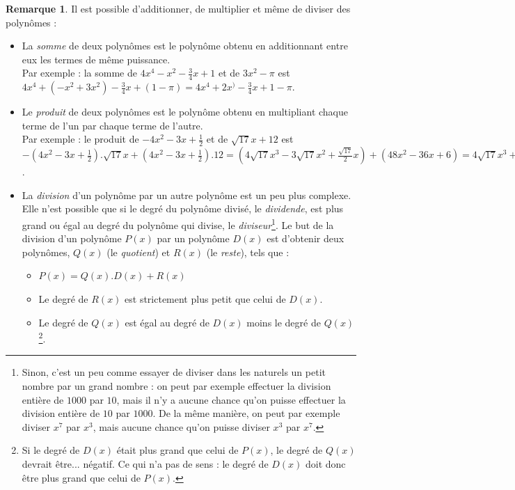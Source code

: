 \documentclass[a4paper,13pt]{scrreprt}
\theoremstyle{plain}
\theoremstyle{definition}
\newtheorem{rema}[subsection]{Remarque}
\begin{document}
\begin{rema}
	Il est possible d'additionner, de multiplier et même de diviser des polynômes :
	\begin{itemize}
		\item [$\bullet$] La \emph{somme} de deux polynômes est le polynôme obtenu en additionnant entre eux les termes de même puissance. \\
		Par exemple : la somme de $4x^4 - x^2 - \frac{3}{4}x +1$ et de $3x^2 - \pi$ est $4x^4 + (-x^2 + 3x^2) - \frac{3}{4}x + (1 - \pi) = 4x^4 + 2x^) - \frac{3}{4}x + 1 - \pi$. \\
		
		\item [$\bullet$] Le \emph{produit} de deux polynômes est le polynôme obtenu en multipliant chaque terme de l'un par chaque terme de l'autre. \\
		Par exemple : le produit de $ - 4x^2 - 3x +\frac{1}{2}$ et de $\sqrt{17}x + 12$ est $- (4x^2 - 3x +\frac{1}{2}).\sqrt{17}x + (4x^2 - 3x +\frac{1}{2}). 12 = (4\sqrt{17}x^3 - 3\sqrt{17}x^2 +\frac{\sqrt{17}}{2}x) + (48x^2 - 36x + 6) = 4\sqrt{17}x^3 + (- 3\sqrt{17}x^2 + 48x^2) + (\frac{\sqrt{17}}{2}x+36x)+6 = 4\sqrt{17}x^3 + (- 3\sqrt{17} + 48)x^2 + (\frac{\sqrt{17}}{2}+36)x + 6$. \\
		\item [$\bullet$] La \emph{division} d'un polynôme par un autre polynôme est un peu plus complexe. Elle n'est possible que si le degré du polynôme divisé, le \emph{dividende}, est plus grand ou égal au degré du polynôme qui divise, le \emph{diviseur}\footnote{Sinon, c'est un peu comme essayer de diviser dans les naturels un petit nombre par un grand nombre : on peut par exemple effectuer la division entière de $1000$ par $10$, mais il n'y a aucune chance qu'on puisse effectuer la division entière de $10$ par $1000$. De la même manière, on peut par exemple diviser $x^7$ par $x^3$, mais aucune chance qu'on puisse diviser $x^3$ par $x^7$.}. Le but de la division d'un polynôme $P(x)$ par un polynôme $D(x)$ est d'obtenir deux polynômes, $Q(x)$ (le \emph{quotient}) et $R(x)$ (le \emph{reste}), tels que :
		\begin{itemize}
			\item [$\bullet$] $P(x) = Q(x).D(x) + R(x)$
			\item [$\bullet$] Le degré de $R(x)$ est strictement plus petit que celui de $D(x)$.
			\item [$\bullet$] Le degré de $Q(x)$ est égal au degré de $D(x)$ moins le degré de $Q(x)$\footnote{Si le degré de $D(x)$ était plus grand que celui de $P(x)$, le degré de $Q(x)$ devrait être... négatif. Ce qui n'a pas de sens : le degré de $D(x)$ doit donc être plus grand que celui de $P(x)$.}.

\end{itemize}
\end{itemize}
\end{rema}
\end{document}
